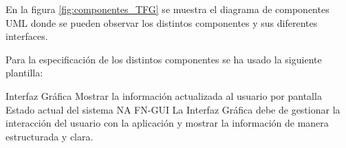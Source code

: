 En la figura \ref{fig:componentes_TFG} se muestra el diagrama de componentes UML \cite{Cook2017} donde se pueden observar los distintos componentes y sus diferentes interfaces.


Para la especificación de los distintos componentes se ha usado la siguiente plantilla: 

\printcomptemplate

\begin{component}{Interfaz Gráfica}
{Mostrar la información actualizada al usuario por pantalla}
{} %
{Estado actual del sistema} %
{NA} %
{FN-GUI} %
La Interfaz Gráfica debe de gestionar la interacción del usuario con la aplicación y mostrar la información de manera estructurada y clara. %
\end{component}




\FloatBarrier